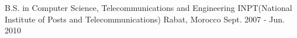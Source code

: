 

\begin{cventries}

  \cventry
    {B.S. in Computer Science, Telecommunications and Engineering} %
    {INPT(National Institute of Posts and Telecommunications)} %
    {Rabat, Morocco} %
    {Sept. 2007 - Jun. 2010} %
    {}

\end{cventries}
